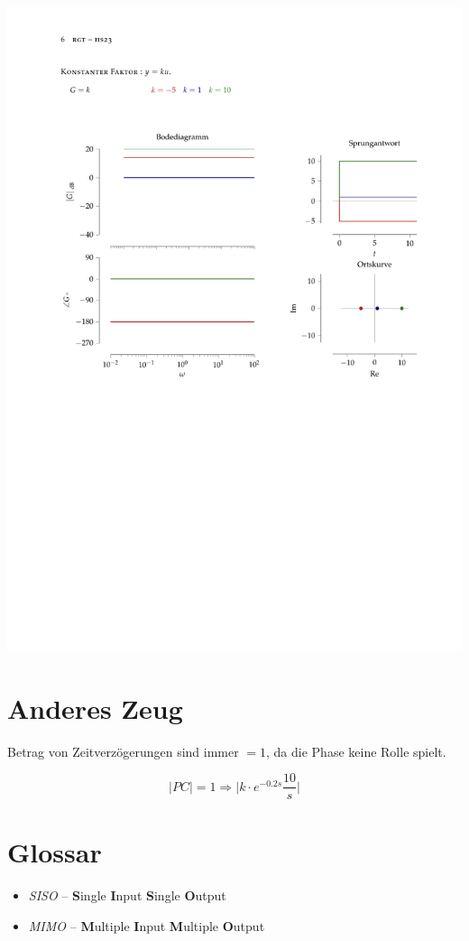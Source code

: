 \documentclass[
  10pt,
  a4paper,
  twocolumn]{article}
\providecommand{\tightlist}{%
  \setlength{\itemsep}{0pt}\setlength{\parskip}{0pt}}\usepackage{longtable,booktabs,array}
\numberwithin{equation}{section}
\begin{document}
\includegraphics[page=8]{append_Grundelemente.pdf}

\hypertarget{anderes-zeug}{%
\section{Anderes Zeug}\label{anderes-zeug}}

Betrag von Zeitverzögerungen sind immer \(=1\), da die Phase keine Rolle
spielt.

\[
|PC| = 1 \Rightarrow \lvert k \cdot e^{-0.2s} \frac{10}{s}\rvert
\]

\hypertarget{glossar}{%
\section{Glossar}\label{glossar}}

\begin{itemize}
\tightlist
\item
  \emph{SISO} -- \textbf{S}ingle \textbf{I}nput \textbf{S}ingle
  \textbf{O}utput
\item
  \emph{MIMO} -- \textbf{M}ultiple \textbf{I}nput \textbf{M}ultiple
  \textbf{O}utput
\end{itemize}
\end{document}
